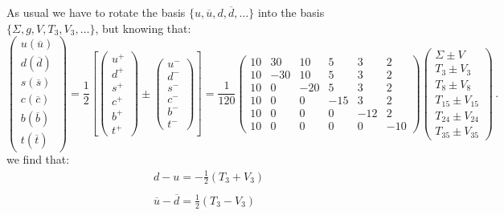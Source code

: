 \documentclass[10pt,a4paper]{article}
\begin{document}
As usual we have to rotate the basis
$\{u,\overline{u},d,\overline{d},\dots\}$ into the basis
$\{\Sigma,g,V,T_3,V_3,\dots\}$, but knowing that:
\begin{equation}\label{ignmazio}
\begin{pmatrix}
u(\overline u)\\
d(\overline d)\\
s(\overline s)\\
c(\overline c)\\
b(\overline b)\\
t(\overline t)
\end{pmatrix}=\frac12\left[\begin{pmatrix}
u^+\\
d^+\\
s^+\\
c^+\\
b^+\\
t^+
\end{pmatrix}\pm\begin{pmatrix}
u^-\\
d^-\\
s^-\\
c^-\\
b^-\\
t^-
\end{pmatrix}\right]=
\frac{1}{120}
\begin{pmatrix}
 10 &  30 &  10 &   5 &   3 &   2 \\
 10 & -30 &  10 &   5 &   3 &   2 \\
 10 &   0 & -20 &   5 &   3 &   2 \\
 10 &   0 &   0 & -15 &   3 &   2 \\
 10 &   0 &   0 &   0 & -12 &   2 \\
 10 &   0 &   0 &   0 &   0 & -10
\end{pmatrix}
\begin{pmatrix}
\Sigma\pm V \\ T_3\pm V_3 \\ T_8\pm V_8 \\ T_{15}\pm V_{15} \\ T_{24}\pm V_{24} \\ T_{35}\pm V_{35}
\end{pmatrix}\,.
\end{equation}
we find that:
\begin{equation}
\begin{array}{l}
\displaystyle d - u = -\frac12(T_3+V_3)\\
\\
\displaystyle \overline{u}-\overline{d} = \frac12(T_3-V_3)
\end{array}
\end{equation}
\end{document}
